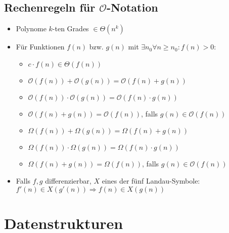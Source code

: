 \documentclass[12pt,a4paper]{article}
\begin{document}
\subsection{Rechenregeln für $\mathcal{O}$-Notation}
\begin{itemize}
\item Polynome $k$-ten Grades $\in\Theta(n^k)$
\item Für Funktionen $f(n)$ bzw. $g(n)$ mit $\exists n_0 \forall n\geq n_0 : f(n) > 0$: \begin{itemize}
\item $c\cdot f(n)\in\Theta(f(n))$
\item $\mathcal{O}(f(n))+\mathcal{O}(g(n))=\mathcal{O}(f(n)+g(n))$
\item $\mathcal{O}(f(n))\cdot\mathcal{O}(g(n))=\mathcal{O}(f(n)\cdot g(n))$
\item $\mathcal{O}(f(n)+g(n))=\mathcal{O}(f(n))$, falls $g(n)\in\mathcal{O}(f(n))$
\item $\Omega(f(n))+\Omega(g(n))=\Omega(f(n)+g(n))$
\item $\Omega(f(n))\cdot\Omega(g(n))=\Omega(f(n)\cdot g(n))$
\item $\Omega(f(n)+g(n))=\Omega(f(n))$, falls $g(n)\in\mathcal{O}(f(n))$
\end{itemize}
\item Falls $f,g$ differenzierbar, $X$ eines der fünf Landau-Symbole:\\
 $f'(n)\in X(g'(n))\Rightarrow f(n)\in X(g(n))$
\end{itemize}
\section{Datenstrukturen}
\end{document}
